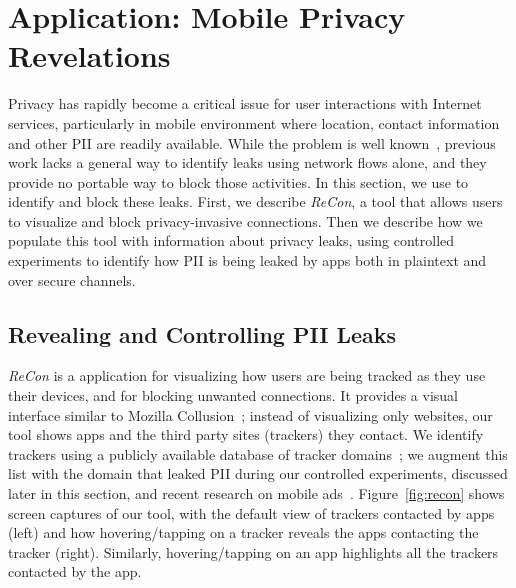 \section{Application: Mobile Privacy\\ Revelations}
\label{sec:characterize-app}


Privacy has rapidly become a critical issue for user interactions with Internet services, particularly in mobile environment where location, contact information and other PII are readily available. 
While the problem is well known~\cite{roesner:webtrackers,leontiadis:mobileads,vallina-rod:ads}, previous work lacks a general way to identify leaks using network flows alone, and they provide no portable way to block those activities. 
In this section, we use \meddle to identify and block these leaks. 
First, we describe \emph{ReCon}, a tool that allows users to visualize and block privacy-invasive connections. 
Then we describe how we populate this tool with information about privacy leaks, using controlled experiments to identify how PII is being leaked by apps both in plaintext and over secure channels. 

\subsection{Revealing and Controlling PII Leaks}
\label{subsec:recon}

\emph{ReCon} is a \meddle application for visualizing how users are being tracked as they use their devices, and for blocking unwanted connections.
It provides a visual interface similar to Mozilla Collusion~\cite{collusion}; instead of visualizing only websites, our tool shows apps and the third party sites (trackers) they contact. 
We identify trackers using a publicly available database of tracker domains~\cite{yoyoads}; we augment this list with the domain that leaked PII during our controlled experiments, discussed later in this section, and recent research on mobile ads~\cite{hornyack:appfence, leontiadis:mobileads}.
Figure~\ref{fig:recon} shows screen captures of our tool, with the default view of trackers contacted by apps (left) and how hovering/tapping on a tracker reveals the apps contacting the tracker (right). 
Similarly, hovering/tapping on an app highlights all the trackers contacted by the app.

